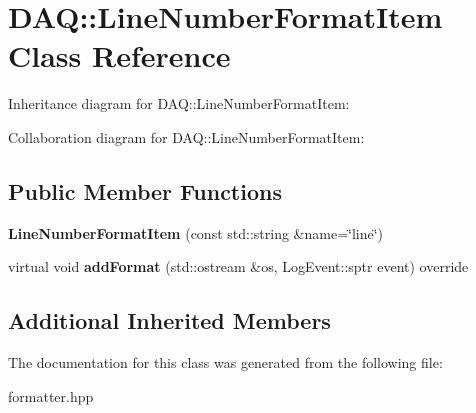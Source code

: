\hypertarget{classDAQ_1_1LineNumberFormatItem}{}\section{D\+AQ\+:\+:Line\+Number\+Format\+Item Class Reference}
\label{classDAQ_1_1LineNumberFormatItem}


Inheritance diagram for D\+AQ\+:\+:Line\+Number\+Format\+Item\+:


Collaboration diagram for D\+AQ\+:\+:Line\+Number\+Format\+Item\+:
\subsection*{Public Member Functions}
\begin{DoxyCompactItemize}
\item 
\mbox{\label{classDAQ_1_1LineNumberFormatItem_a2127e042b5f0fbf982a47fff111bd725}} 
{\bfseries Line\+Number\+Format\+Item} (const std\+::string \&name=\char`\"{}line\char`\"{})
\item 
\mbox{\label{classDAQ_1_1LineNumberFormatItem_a7d7cd7733ed963036d9fa2b0c72e11c4}} 
virtual void {\bfseries add\+Format} (std\+::ostream \&os, Log\+Event\+::sptr event) override
\end{DoxyCompactItemize}
\subsection*{Additional Inherited Members}


The documentation for this class was generated from the following file\+:\begin{DoxyCompactItemize}
\item 
formatter.\+hpp\end{DoxyCompactItemize}
